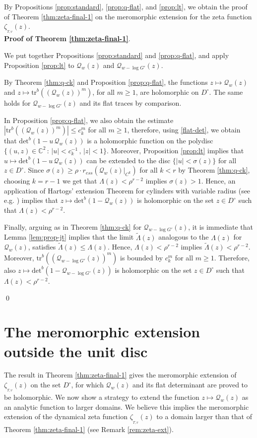 \documentclass[11pt]{amsart}
\theoremstyle{definition}
\theoremstyle{remark}
\theoremstyle{definition}
\numberwithin{equation}{section}
\newcommand{\C}{\mathbb C}
\newcommand{\QQ}{\mathcal{Q}}
\newcommand{\dynzeta}[1]{\zeta_{_{#1}}}
\newcommand{\flattr}{\text{tr}^b}
\newcommand{\flatdet}{\text{det}^b}
\begin{document}
By Propositions \ref{prop:standard}, \ref{prop:q-flat}, and \ref{prop:lt},  we obtain the proof of Theorem \ref{thm:zeta-final-1} on the meromorphic extension for the zeta function $\dynzeta{T,v}(z)$. \\

\noindent \textbf{Proof of Theorem \ref{thm:zeta-final-1}}.
{We put together Propositions \ref{prop:standard} and \ref{prop:q-flat}, and apply Proposition \ref{prop:lt} to $\QQ_w(z)$ and $\QQ_{w-\log G'}(z)$. 

By Theorem \ref{thm:q-ck} and Proposition \ref{prop:q-flat}, the functions $z\mapsto \QQ_w(z)$ and $z\mapsto \flattr((\QQ_w(z))^m)$, for all $m\ge 1$, are holomorphic on $D^\circ$. The same holds for $\QQ_{w-\log G'}(z)$ and its flat traces by comparison.

In Proposition \ref{prop:q-flat}, we also obtain the estimate $|\flattr((\QQ_w(z))^m)| \le c_k^m$ for all $m\ge 1$, therefore, using \eqref{flat-det}, we obtain that $\flatdet(1-u\, \QQ_{w}(z))$ is a holomorphic function on the polydisc $\{(u,z)\in \C^2\, :\, |u|< c_k^{-1}\, ,\, |z|<1\}$. Moreover, Proposition \ref{prop:lt} implies that $u\mapsto \flatdet(1-u\, \QQ_{w}(z))$ can be extended to the disc $\{|u|<\sigma(z)\}$ for all $z\in D^\circ$. Since $\sigma(z) \ge \rho\cdot r_{ess}(\QQ_w(z)|_{C^{k}})$ for all $k<r$ by Theorem \ref{thm:q-ck}, choosing $k=r-1$ we get that $\Lambda(z)<\rho^{r-2}$ implies $\sigma(z)>1$. Hence, an application of Hartogs' extension Theorem for cylinders with variable radius (see e.g. \cite{ho}) implies that $z\mapsto \flatdet(1-\QQ_{w}(z))$ is holomorphic on the set $z\in D^\circ$ such that $\Lambda(z)<\rho^{r-2}$. 

Finally, arguing as in Theorem \ref{thm:q-ck} for $\QQ_{w-\log G'}(z)$, it is immediate that Lemma \ref{lem:prop-jt} implies that the limit $\tilde \Lambda(z)$ analogous to the $\Lambda(z)$ for $\QQ_w(z)$, satisfies $\tilde \Lambda(z)\le \Lambda(z)$. Hence, $\Lambda(z)<\rho^{r-2}$ implies $\tilde\Lambda(z)<\rho^{r-2}$. Moreover, $\flattr((\QQ_{w-\log G'}(z))^m)$ is bounded by $c_k^m$ for all $m\ge 1$. Therefore, also $z\mapsto \flatdet(1-\QQ_{w-\log G'}(z))$ is holomorphic on the set $z\in D^\circ$ such that $\Lambda(z)<\rho^{r-2}$.
}
\qed

\section{The meromorphic extension outside the unit disc} \label{sec:meromorphic}
{The result in Theorem \ref{thm:zeta-final-1} gives the meromorphic extension of $\dynzeta{T,v}(z)$ on the set $D^\circ$, for which $\QQ_w(z)$ and its flat determinant are proved to be holomorphic. We now show a strategy to extend the function $z\mapsto \QQ_w(z)$ as an analytic function to larger domains. We believe this implies the meromorphic extension of the dynamical zeta function $\dynzeta{T,v}(z)$ to a domain larger than that of Theorem \ref{thm:zeta-final-1} (see Remark \ref{rem:zeta-ext}).}
\end{document}
